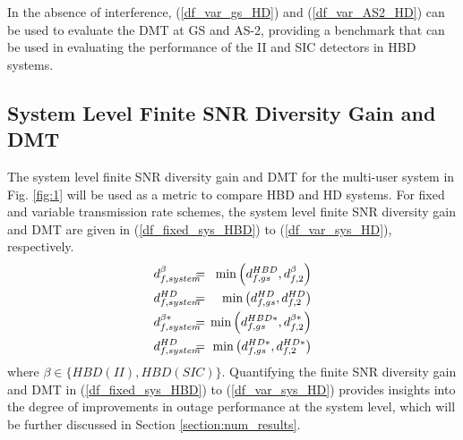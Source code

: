In the absence of interference, (\ref{df_var_gs_HD}) and (\ref{df_var_AS2_HD}) can be used to evaluate the DMT at GS and AS-2, providing a benchmark that can be used in evaluating the performance of the II and SIC detectors in HBD systems.

\subsection{System Level Finite SNR Diversity Gain and DMT}

The system level finite SNR diversity gain and DMT for the multi-user system in Fig. \ref{fig:1} will be used as a metric to compare HBD and HD systems. For fixed and variable transmission rate schemes, the system level finite SNR diversity gain and DMT are given in (\ref{df_fixed_sys_HBD}) to (\ref{df_var_sys_HD}), respectively.
\begin{eqnarray} 
d_{f,system}^{\beta} \hspace{-0.1in} & = &\hspace{-0.08in} \min\left( d_{f,gs}^{HBD}, d_{f,2}^{\beta} \right) \label{df_fixed_sys_HBD} \\
d_{f,system}^{HD} \hspace{-0.1in} & = &\hspace{-0.08in} \min\left( d_{f,gs}^{HD}, d_{f,2}^{HD}  \label{df_fixed_sys_HD} \right) \\
d_{f,system}^{\beta*} \hspace{-0.1in} & = &\hspace{-0.08in} \min\left( d_{f,gs}^{HBD*}, d_{f,2}^{\beta*} \right) \label{df_var_sys_HBD} \\
d_{f,system}^{HD} \hspace{-0.1in} & = &\hspace{-0.08in} \min\left( d_{f,gs}^{HD*}, d_{f,2}^{HD*} \right) \label{df_var_sys_HD}
\end{eqnarray}
where $\beta \in \{HBD(II), HBD(SIC)\}$. Quantifying the finite SNR diversity gain and DMT in (\ref{df_fixed_sys_HBD}) to (\ref{df_var_sys_HD}) provides insights into the degree of improvements in outage performance at the system level, which will be further discussed in Section \ref{section:num_results}.  

